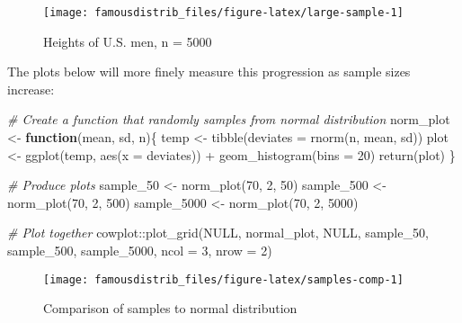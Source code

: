 \documentclass[
]{article}
\newenvironment{Shaded}{\begin{snugshade}}{\end{snugshade}}
\newcommand{\AttributeTok}[1]{\textcolor[rgb]{0.77,0.63,0.00}{#1}}
\newcommand{\CommentTok}[1]{\textcolor[rgb]{0.56,0.35,0.01}{\textit{#1}}}
\newcommand{\ConstantTok}[1]{\textcolor[rgb]{0.00,0.00,0.00}{#1}}
\newcommand{\ControlFlowTok}[1]{\textcolor[rgb]{0.13,0.29,0.53}{\textbf{#1}}}
\newcommand{\DecValTok}[1]{\textcolor[rgb]{0.00,0.00,0.81}{#1}}
\newcommand{\FunctionTok}[1]{\textcolor[rgb]{0.00,0.00,0.00}{#1}}
\newcommand{\NormalTok}[1]{#1}
\newcommand{\OtherTok}[1]{\textcolor[rgb]{0.56,0.35,0.01}{#1}}
\newcommand{\SpecialCharTok}[1]{\textcolor[rgb]{0.00,0.00,0.00}{#1}}
\begin{document}
\begin{figure}

{\centering \texttt{[image: famousdistrib\_files/figure-latex/large-sample-1]} 

}

\caption{Heights of U.S. men, n = 5000}\label{fig:large-sample}
\end{figure}

The plots below will more finely measure this progression as sample sizes increase:

\begin{Shaded}
\begin{Highlighting}[]
\CommentTok{\# Create a function that randomly samples from normal distribution}
\NormalTok{norm\_plot }\OtherTok{\textless{}{-}} \ControlFlowTok{function}\NormalTok{(mean, sd, n)\{}
\NormalTok{  temp }\OtherTok{\textless{}{-}} \FunctionTok{tibble}\NormalTok{(}\AttributeTok{deviates =} \FunctionTok{rnorm}\NormalTok{(n, mean, sd))}
\NormalTok{  plot }\OtherTok{\textless{}{-}} \FunctionTok{ggplot}\NormalTok{(temp, }\FunctionTok{aes}\NormalTok{(}\AttributeTok{x =}\NormalTok{ deviates)) }\SpecialCharTok{+}
    \FunctionTok{geom\_histogram}\NormalTok{(}\AttributeTok{bins =} \DecValTok{20}\NormalTok{)}
  \FunctionTok{return}\NormalTok{(plot)}
\NormalTok{\}}

\CommentTok{\# Produce plots}
\NormalTok{sample\_50 }\OtherTok{\textless{}{-}} \FunctionTok{norm\_plot}\NormalTok{(}\DecValTok{70}\NormalTok{, }\DecValTok{2}\NormalTok{, }\DecValTok{50}\NormalTok{)}
\NormalTok{sample\_500 }\OtherTok{\textless{}{-}} \FunctionTok{norm\_plot}\NormalTok{(}\DecValTok{70}\NormalTok{, }\DecValTok{2}\NormalTok{, }\DecValTok{500}\NormalTok{)}
\NormalTok{sample\_5000 }\OtherTok{\textless{}{-}} \FunctionTok{norm\_plot}\NormalTok{(}\DecValTok{70}\NormalTok{, }\DecValTok{2}\NormalTok{, }\DecValTok{5000}\NormalTok{)}

\CommentTok{\# Plot together}
\NormalTok{cowplot}\SpecialCharTok{::}\FunctionTok{plot\_grid}\NormalTok{(}\ConstantTok{NULL}\NormalTok{, normal\_plot, }\ConstantTok{NULL}\NormalTok{, sample\_50, sample\_500, sample\_5000, }\AttributeTok{ncol =} \DecValTok{3}\NormalTok{, }\AttributeTok{nrow =} \DecValTok{2}\NormalTok{)}
\end{Highlighting}
\end{Shaded}

\begin{figure}

{\centering \texttt{[image: famousdistrib\_files/figure-latex/samples-comp-1]} 

}

\caption{Comparison of samples to normal distribution}\label{fig:samples-comp}
\end{figure}
\end{document}
